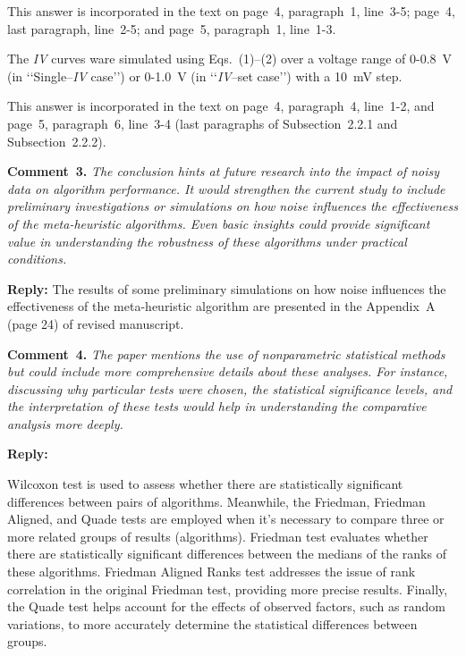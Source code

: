 \documentclass[a4paper,fleqn]{cas-sc}
\begin{document}
This answer is incorporated in the text on page~4, paragraph~1, line~3-5;
page~4, last paragraph, line~2-5;
and page~5, paragraph~1, line~1-3.


The \emph{IV} curves ware simulated using Eqs.~(1)--(2) over a voltage range of 0-0.8~V (in ‘‘Single--\emph{IV} case’’) or
0-1.0~V (in ‘‘\emph{IV}--set case’’) with a 10~mV step.

This answer is incorporated in the text on page~4, paragraph~4, line~1-2,
 and page~5, paragraph~6, line~3-4 
(last paragraphs of Subsection~2.2.1 and Subsection~2.2.2).


\vspace{1cm}
\noindent
\textcolor[rgb]{0.00,0.50,1.00}{\textbf{Comment~3.}}
\emph{The conclusion hints at future research into the impact of noisy data on algorithm performance.
It would strengthen the current study to include preliminary investigations or simulations on how noise influences the effectiveness of the meta-heuristic algorithms.
Even basic insights could provide significant value in understanding the robustness of these algorithms under practical conditions.}

\noindent
\textcolor[rgb]{0.51,0.00,0.00}{\textbf{Reply:}}
The results of some preliminary simulations on how noise influences the effectiveness of
the meta-heuristic algorithm are presented in the Appendix~A (page 24) of revised manuscript.


\vspace{1cm}
\noindent
\textcolor[rgb]{0.00,0.50,1.00}{\textbf{Comment~4.}}
\emph{The paper mentions the use of nonparametric statistical methods but could include more comprehensive details about these analyses.
For instance, discussing why particular tests were chosen, the statistical significance levels,
 and the interpretation of these tests would help in understanding the comparative analysis more deeply.}

\noindent
\textcolor[rgb]{0.51,0.00,0.00}{\textbf{Reply:}}

Wilcoxon test is used to assess whether there are statistically significant differences between pairs of algorithms.
Meanwhile, the Friedman, Friedman Aligned, and Quade tests are employed when it's necessary to compare three or more related groups of results (algorithms).
Friedman test evaluates whether there are statistically significant differences between the medians of the ranks of these algorithms.
Friedman Aligned Ranks test addresses the issue of rank correlation in the original Friedman test, providing more precise results.
Finally, the Quade test helps account for the effects of observed factors, such as random variations,
to more accurately determine the statistical differences between groups.
\end{document}
